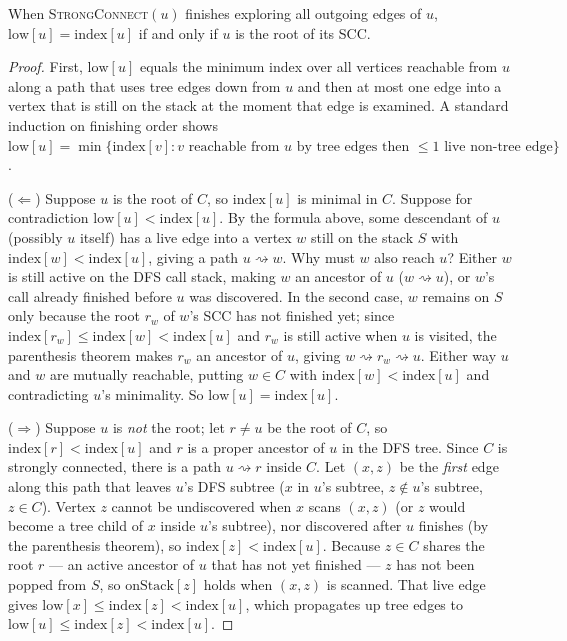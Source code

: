 \begin{lemma}
\label{ch05:lem-root}
When \textsc{StrongConnect}$(u)$ finishes exploring all outgoing edges of $u$,
$\mathrm{low}[u]=\mathrm{index}[u]$ if and only if $u$ is the root of its SCC.
\end{lemma}

\begin{proof}
First, $\mathrm{low}[u]$ equals the minimum index over all vertices reachable from $u$ along a path that uses tree edges down from $u$ and then at most one edge into a vertex that is still on the stack at the moment that edge is examined. A standard induction on finishing order shows $\mathrm{low}[u]=\min\{\mathrm{index}[v] : v \text{ reachable from } u \text{ by tree edges then } \le 1 \text{ live non-tree edge}\}$.

($\Leftarrow$) Suppose $u$ is the root of $C$, so $\mathrm{index}[u]$ is minimal in $C$. Suppose for contradiction $\mathrm{low}[u]<\mathrm{index}[u]$. By the formula above, some descendant of $u$ (possibly $u$ itself) has a live edge into a vertex $w$ still on the stack $S$ with $\mathrm{index}[w]<\mathrm{index}[u]$, giving a path $u\rightsquigarrow w$. Why must $w$ also reach $u$? Either $w$ is still active on the DFS call stack, making $w$ an ancestor of $u$ ($w\rightsquigarrow u$), or $w$'s call already finished before $u$ was discovered. In the second case, $w$ remains on $S$ only because the root $r_w$ of $w$'s SCC has not finished yet; since $\mathrm{index}[r_w]\le\mathrm{index}[w]<\mathrm{index}[u]$ and $r_w$ is still active when $u$ is visited, the parenthesis theorem makes $r_w$ an ancestor of $u$, giving $w\rightsquigarrow r_w\rightsquigarrow u$. Either way $u$ and $w$ are mutually reachable, putting $w\in C$ with $\mathrm{index}[w]<\mathrm{index}[u]$ and contradicting $u$'s minimality. So $\mathrm{low}[u]=\mathrm{index}[u]$.

($\Rightarrow$) Suppose $u$ is \emph{not} the root; let $r\ne u$ be the root of $C$, so $\mathrm{index}[r]<\mathrm{index}[u]$ and $r$ is a proper ancestor of $u$ in the DFS tree. Since $C$ is strongly connected, there is a path $u\rightsquigarrow r$ inside $C$. Let $(x,z)$ be the \emph{first} edge along this path that leaves $u$'s DFS subtree ($x$ in $u$'s subtree, $z\notin u$'s subtree, $z\in C$). Vertex $z$ cannot be undiscovered when $x$ scans $(x,z)$ (or $z$ would become a tree child of $x$ inside $u$'s subtree), nor discovered after $u$ finishes (by the parenthesis theorem), so $\mathrm{index}[z]<\mathrm{index}[u]$. Because $z\in C$ shares the root $r$ --- an active ancestor of $u$ that has not yet finished --- $z$ has not been popped from $S$, so $\mathrm{onStack}[z]$ holds when $(x,z)$ is scanned. That live edge gives $\mathrm{low}[x]\le\mathrm{index}[z]<\mathrm{index}[u]$, which propagates up tree edges to $\mathrm{low}[u]\le\mathrm{index}[z]<\mathrm{index}[u]$.
\end{proof}

